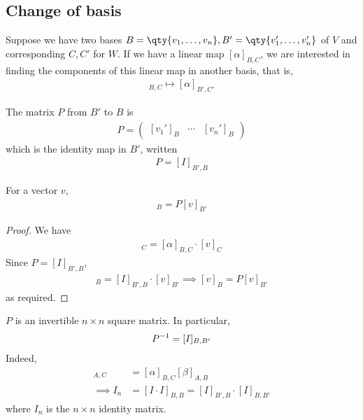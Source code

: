     \subsection{Change of basis}
    Suppose we have two bases $B = \qty{v_1, \dots, v_n}, B' = \qty{v_1', \dots, v_n'}$ of $V$ and corresponding $C, C'$ for $W$.
    If we have a linear map $[\alpha]_{B,C}$, we are interested in finding the components of this linear map in another basis, that is,
    \begin{align*}
        [\alpha]_{B,C} \mapsto [\alpha]_{B',C'}
    \end{align*}
    \begin{definition}
        The  matrix $P$ from $B'$ to $B$ is
        \begin{align*}
            P = \begin{pmatrix}
                [v_1']_B & \cdots & [v_n']_B
            \end{pmatrix}
        \end{align*}
        which is the identity map in $B'$, written
        \begin{align*}
            P = [I]_{B', B}
        \end{align*}
    \end{definition}
    \begin{lemma}
        For a vector $v$,
        \begin{align*}
            [v]_B = P [v]_{B'}
        \end{align*}
    \end{lemma}
    \begin{proof}
        We have
        \begin{align*}
            [\alpha(v)]_C = [\alpha]_{B,C} \cdot [v]_C
        \end{align*}
        Since $P = [I]_{B', B}$,
        \begin{align*}
            [I(v)]_B = [I]_{B', B} \cdot [v]_{B'} \implies [v]_B = P[v]_{B'}
        \end{align*}
        as required.
    \end{proof}
    \begin{remark}
        $P$ is an invertible $n \times n$ square matrix.
        In particular,
        \begin{align*}
            P^{-1} = [I]_{B,B'}
        \end{align*}
        Indeed,
        \begin{align*}
            [\alpha \circ \beta]_{A, C} &= [\alpha]_{B, C} [\beta]_{A, B} \\
            \implies I_n &= [I \cdot I]_{B,B} = [I]_{B',B} \cdot [I]_{B,B'}
        \end{align*}
        where $I_n$ is the $n \times n$ identity matrix.
    \end{remark}

